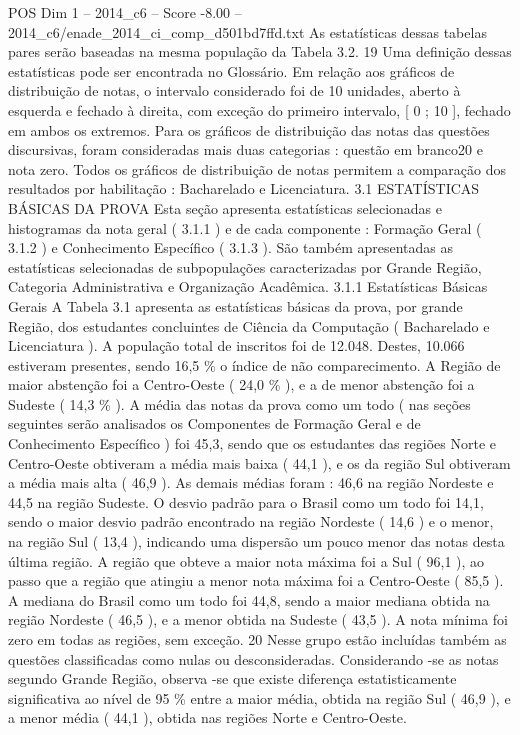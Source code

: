 \begin{textsample}{POS Dim 1 – 2014\_c6 – Score -8.00 – 2014\_c6/enade\_2014\_ci\_comp\_d501bd7ffd.txt}
As estatísticas dessas tabelas pares serão baseadas na mesma população da Tabela 3.2. 19 Uma definição dessas estatísticas pode ser encontrada no Glossário.
Em relação aos gráficos de distribuição de notas, o intervalo considerado foi de 10 unidades, aberto à esquerda e fechado à direita, com exceção do primeiro intervalo, [ 0 ; 10 ], fechado em ambos os extremos.
Para os gráficos de distribuição das notas das questões discursivas, foram consideradas mais duas categorias : questão em branco20 e nota zero.
Todos os gráficos de distribuição de notas permitem a comparação dos resultados por habilitação : Bacharelado e Licenciatura. 3.1 ESTATÍSTICAS BÁSICAS DA PROVA Esta seção apresenta estatísticas selecionadas e histogramas da nota geral ( 3.1.1 ) e de cada componente : Formação Geral ( 3.1.2 ) e Conhecimento Específico ( 3.1.3 ).
São também apresentadas as estatísticas selecionadas de subpopulações caracterizadas por Grande Região, Categoria Administrativa e Organização Acadêmica. 3.1.1 Estatísticas Básicas Gerais A Tabela 3.1 apresenta as estatísticas básicas da prova, por grande Região, dos estudantes concluintes de Ciência da Computação ( Bacharelado e Licenciatura ).
A população total de inscritos foi de 12.048.
Destes, 10.066 estiveram presentes, sendo 16,5 \% o índice de não comparecimento.
A Região de maior abstenção foi a Centro-Oeste ( 24,0 \% ), e a de menor abstenção foi a Sudeste ( 14,3 \% ).
A média das notas da prova como um todo ( nas seções seguintes serão analisados os Componentes de Formação Geral e de Conhecimento Específico ) foi 45,3, sendo que os estudantes das regiões Norte e Centro-Oeste obtiveram a média mais baixa ( 44,1 ), e os da região Sul obtiveram a média mais alta ( 46,9 ).
As demais médias foram : 46,6 na região Nordeste e 44,5 na região Sudeste.
O desvio padrão para o Brasil como um todo foi 14,1, sendo o maior desvio padrão encontrado na região Nordeste ( 14,6 ) e o menor, na região Sul ( 13,4 ), indicando uma dispersão um pouco menor das notas desta última região.
A região que obteve a maior nota máxima foi a Sul ( 96,1 ), ao passo que a região que atingiu a menor nota máxima foi a Centro-Oeste ( 85,5 ).
A mediana do Brasil como um todo foi 44,8, sendo a maior mediana obtida na região Nordeste ( 46,5 ), e a menor obtida na Sudeste ( 43,5 ).
A nota mínima foi zero em todas as regiões, sem exceção. 20 Nesse grupo estão incluídas também as questões classificadas como nulas ou desconsideradas.
Considerando -se as notas segundo Grande Região, observa -se que existe diferença estatisticamente significativa ao nível de 95 \% entre a maior média, obtida na região Sul ( 46,9 ), e a menor média ( 44,1 ), obtida nas regiões Norte e Centro-Oeste.

\end{textsample}
